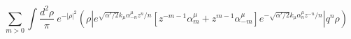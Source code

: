 \begin{equation}
\sum_{m>0}\int \frac{d^2\rho}{\pi}\ e^{-|\rho|^2} (\rho|
e^{\sqrt{\alpha'/2}k_\mu \alpha_{-n}^\mu z^n/n}
\left[z^{-m-1}\alpha_m^\mu+z^{m-1}\alpha_{-m}^\mu\right]
e^{-\sqrt{\alpha'/2}k_\mu \alpha_{n}^\mu z^{-n}/n}|q^n\rho)
\end{equation}

